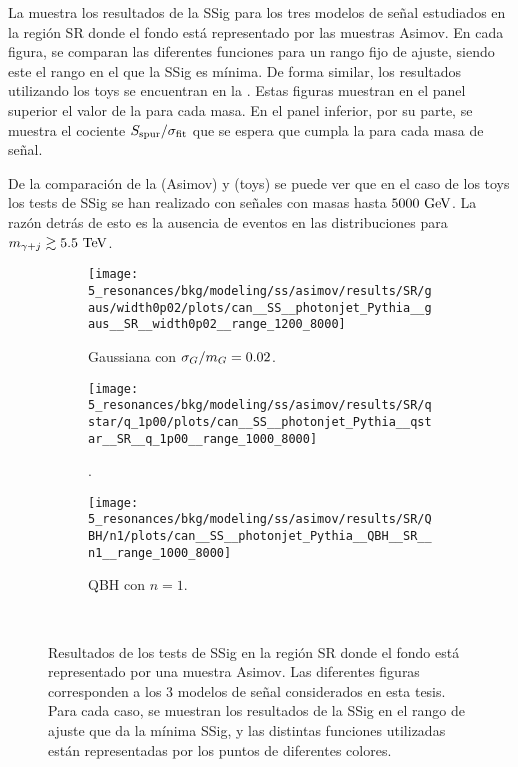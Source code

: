 La \Fig{\ref{fig:bkg_modeling:sstest_results_asimov_SR}} muestra los resultados de la \ac{SSig} para los tres modelos de señal estudiados en la región SR donde el fondo está representado por las muestras Asimov. En cada figura, se comparan las diferentes funciones para un rango fijo de ajuste, siendo este el rango en el que la \ac{SSig} es mínima. De forma similar, los resultados utilizando los toys se encuentran en la \Fig{\ref{fig:bkg_modeling:sstest_results_toys_SR}}. Estas figuras muestran en el panel superior el valor de la \sspur para cada masa. En el panel inferior, por su parte, se muestra el cociente \(S_{\text{spur}} / \sigma_{\text{fit}}\) que se espera que cumpla la \Eqn{\ref{eq:bkg:modeling:sigbkg:sstest:condition}} para cada masa de señal.

De la comparación de la \Fig{\ref{fig:bkg_modeling:sstest_results_asimov_SR}} (Asimov) y \Fig{\ref{fig:bkg_modeling:sstest_results_toys_SR}} (toys) se puede ver que en el caso de los toys los tests de \ac{SSig} se han realizado con señales con masas hasta \(5000~\text{GeV}\). La razón detrás de esto es la ausencia de eventos en las distribuciones \myj para \(m_{\gamma+j} \gtrsim 5.5~\text{TeV}\).


\begin{figure}[ht!]
    \centering
    \begin{subfigure}[h]{0.32\linewidth}
        \centering
        \texttt{[image: 5\_resonances/bkg/modeling/ss/asimov/results/SR/gaus/width0p02/plots/can\_\_SS\_\_photonjet\_Pythia\_\_gaus\_\_SR\_\_width0p02\_\_range\_1200\_8000]}
        \caption{Gaussiana con \(\sigma_G / m_{G} = 0.02\).}
    \end{subfigure}
    \hfill
    \begin{subfigure}[h]{0.32\linewidth}
        \centering
        \texttt{[image: 5\_resonances/bkg/modeling/ss/asimov/results/SR/qstar/q\_1p00/plots/can\_\_SS\_\_photonjet\_Pythia\_\_qstar\_\_SR\_\_q\_1p00\_\_range\_1000\_8000]}
        \caption{\qstar.}
    \end{subfigure}
    \begin{subfigure}[h]{0.32\linewidth}
        \centering
        \texttt{[image: 5\_resonances/bkg/modeling/ss/asimov/results/SR/QBH/n1/plots/can\_\_SS\_\_photonjet\_Pythia\_\_QBH\_\_SR\_\_n1\_\_range\_1000\_8000]}
        \caption{\ac{QBH} con \(n=1\).}
    \end{subfigure}\\
    \caption{Resultados de los tests de \ac{SSig} en la región SR donde el fondo está representado por una muestra Asimov. Las diferentes figuras corresponden a los 3 modelos de señal considerados en esta tesis. Para cada caso, se muestran los resultados de la \ac{SSig} en el rango de ajuste que da la mínima \ac{SSig}, y las distintas funciones utilizadas están representadas por los puntos de diferentes colores.}
    \label{fig:bkg_modeling:sstest_results_asimov_SR}
\end{figure}


